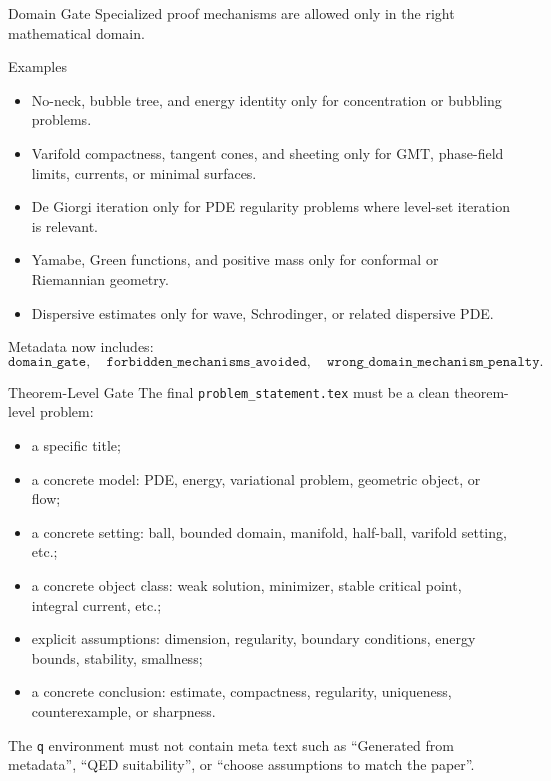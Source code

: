 \documentclass[aspectratio=169,11pt]{beamer}
\begin{document}
\begin{frame}{Domain Gate}
  Specialized proof mechanisms are allowed only in the right mathematical domain.

  \begin{block}{Examples}
    \begin{itemize}
      \item No-neck, bubble tree, and energy identity only for concentration or bubbling problems.
      \item Varifold compactness, tangent cones, and sheeting only for GMT, phase-field limits, currents, or minimal surfaces.
      \item De Giorgi iteration only for PDE regularity problems where level-set iteration is relevant.
      \item Yamabe, Green functions, and positive mass only for conformal or Riemannian geometry.
      \item Dispersive estimates only for wave, Schrodinger, or related dispersive PDE.
    \end{itemize}
  \end{block}

  Metadata now includes:
  \[
    \texttt{domain\_gate},\quad
    \texttt{forbidden\_mechanisms\_avoided},\quad
    \texttt{wrong\_domain\_mechanism\_penalty}.
  \]
\end{frame}

\begin{frame}{Theorem-Level Gate}
  The final \texttt{problem\_statement.tex} must be a clean theorem-level problem:

  \begin{itemize}
    \item a specific title;
    \item a concrete model: PDE, energy, variational problem, geometric object, or flow;
    \item a concrete setting: ball, bounded domain, manifold, half-ball, varifold setting, etc.;
    \item a concrete object class: weak solution, minimizer, stable critical point, integral current, etc.;
    \item explicit assumptions: dimension, regularity, boundary conditions, energy bounds, stability, smallness;
    \item a concrete conclusion: estimate, compactness, regularity, uniqueness, counterexample, or sharpness.
  \end{itemize}

  \vspace{0.4em}
  The \texttt{q} environment must not contain meta text such as ``Generated from metadata'', ``QED suitability'', or ``choose assumptions to match the paper''.
\end{frame}
\end{document}
